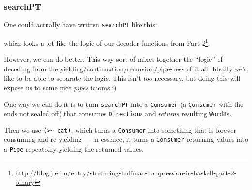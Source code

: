 \documentclass[]{article}
\newenvironment{Shaded}{\begin{snugshade}}{\end{snugshade}}
\newcommand{\DataTypeTok}[1]{\textcolor[rgb]{0.13,0.29,0.53}{#1}}
\newcommand{\FunctionTok}[1]{\textcolor[rgb]{0.00,0.00,0.00}{#1}}
\newcommand{\KeywordTok}[1]{\textcolor[rgb]{0.13,0.29,0.53}{\textbf{#1}}}
\newcommand{\NormalTok}[1]{#1}
\newcommand{\OtherTok}[1]{\textcolor[rgb]{0.56,0.35,0.01}{#1}}
\renewcommand{\href}[2]{#2\footnote{\url{#1}}}
\begin{document}
\hypertarget{searchpt}{%
\subsubsection{searchPT}\label{searchpt}}

One could actually have written \texttt{searchPT} like this:

\begin{Shaded}
\end{Shaded}

which looks a lot like the logic of our decoder functions from
\href{http://blog.jle.im/entry/streaming-huffman-compression-in-haskell-part-2-binary}{Part
2}.

However, we can do better. This way sort of mixes together the ``logic'' of
decoding from the yielding/continuation/recursion/pipe-ness of it all. Ideally
we'd like to be able to separate the logic. This isn't \emph{too} necessary, but
doing this will expose us to some nice \emph{pipes} idioms :)

One way we can do it is to turn \texttt{searchPT} into a
\texttt{Consumer\textquotesingle{}} (a \texttt{Consumer} with the ends not
sealed off) that consumes \texttt{Direction}s and \emph{returns} resulting
\texttt{Word8}s.

Then we use \texttt{(\textgreater{}\textasciitilde{}\ cat)}, which turns a
\texttt{Consumer\textquotesingle{}} into something that is forever consuming and
re-yielding --- in essence, it turns a \texttt{Consumer\textquotesingle{}}
returning values into a \texttt{Pipe} repeatedly yielding the returned values.
\end{document}
